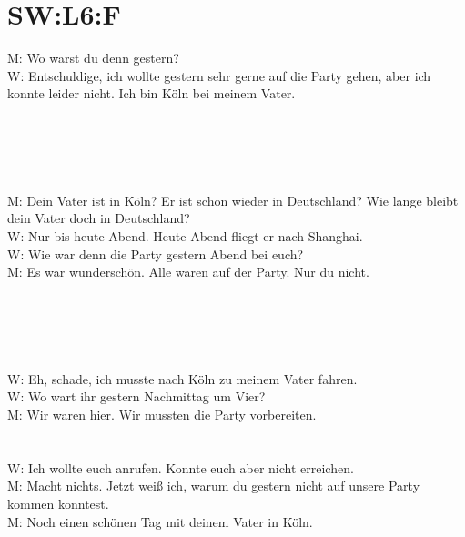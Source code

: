 \section{SW:L6:F}
\noindent
M: Wo warst du denn gestern? \\
W: Entschuldige, ich wollte gestern sehr gerne auf die Party gehen,  aber ich konnte leider nicht. Ich bin Köln bei meinem Vater.  \\
\\
\\
\\
\\
\\
\noindent
M: Dein Vater ist in Köln? Er ist schon wieder in Deutschland? Wie lange bleibt dein Vater doch in Deutschland? \\
W: Nur bis heute Abend. Heute Abend fliegt er nach Shanghai. \\
W: Wie war denn die Party gestern Abend bei euch? \\
M: Es war wunderschön.  Alle waren auf der Party. Nur du nicht.  \\
\\
\\
\\
\\
\\
\noindent
W: Eh, schade, ich musste nach Köln zu meinem Vater fahren. \\
W: Wo wart ihr gestern Nachmittag um Vier? \\
M: Wir waren hier. Wir mussten die Party vorbereiten.  \\
\\
\\
\noindent
W: Ich wollte euch anrufen. Konnte euch aber nicht erreichen.  \\
M: Macht nichts. Jetzt weiß ich, warum du gestern nicht auf unsere Party kommen konntest. \\
M: Noch einen schönen Tag mit deinem Vater in Köln.   \\

